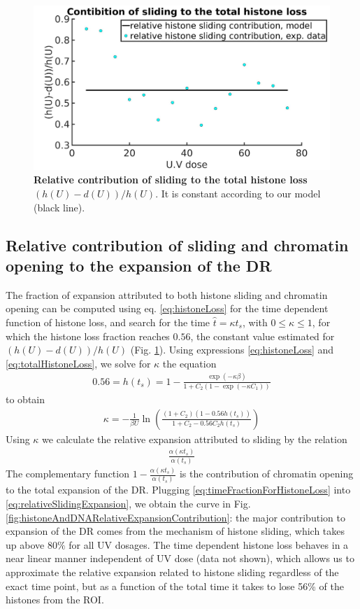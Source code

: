 \documentclass[12pt]{article}
\newcommand{\beq}{\begin{eqnarray}}
\newcommand{\eeq}{\end{eqnarray}}
\begin{document}
\begin{figure}[H]
\centering
\includegraphics[width=0.5\linewidth, height=0.3\textheight]{relativeSlidingContribution}
\caption{\textbf{Relative contribution of sliding to the total histone loss $(h(U)-d(U))/h(U)$}. It is constant according to our model (black line).}
\label{fig:relativeSlidingContribution}
\end{figure}

\subsection{Relative contribution of sliding and chromatin opening to the expansion of the DR}\label{subsection:RelativecontibutionOfSlidingAndOpeningToExpansion}
The fraction of expansion attributed to both histone sliding and chromatin opening can be computed using eq. \ref{eq:histoneLoss} for the time dependent function of histone loss, and search for the time $\hat{t}=\kappa t_s$, with $0\leq \kappa\leq 1$, for which the histone loss fraction reaches $0.56$, the constant value estimated for $(h(U)-d(U))/h(U)$ (Fig. \ref{fig:relativeSlidingContribution}). Using expressions \ref{eq:histoneLoss} and \ref{eq:totalHistoneLoss}, we solve for $\kappa$ the equation
\beq
0.56=h(t_s)=1-\frac{\exp(-\kappa \beta)}{ 1+C_2(1-\exp(-\kappa C_1))}
\eeq
to obtain
\beq \label{eq:timeFractionForHistoneLoss}
\kappa = -\frac{1}{\beta U}\ln{\left( \frac{(1+C_2)(1-0.56h(t_s))}{1+C_2 -0.56C_2h(t_s)}\right)}
\eeq
Using $\kappa$ we calculate the relative expansion attributed to sliding by the relation
\beq \label{eq:relativeSlidingExpansion}
\frac{\alpha(\kappa t_s)}{\alpha (t_s)}
\eeq
The complementary function $1-\frac{\alpha(\kappa t_s)}{\alpha(t_s)}$ is the contribution of chromatin opening to the total expansion of the DR. Plugging \ref{eq:timeFractionForHistoneLoss} into \ref{eq:relativeSlidingExpansion}, we obtain the curve in Fig. \ref{fig:histoneAndDNARelativeExpansionContribution}: the major contribution to expansion of the DR comes from the mechanism of histone sliding, which takes up above $80\%$ for all UV dosages. The time dependent histone loss behaves in a near linear manner independent of UV dose (data not shown), which allows us to approximate the relative expansion related to histone sliding regardless of the exact time point, but as a function of the total time it takes to lose 56\% of the histones from the ROI.
\end{document}

